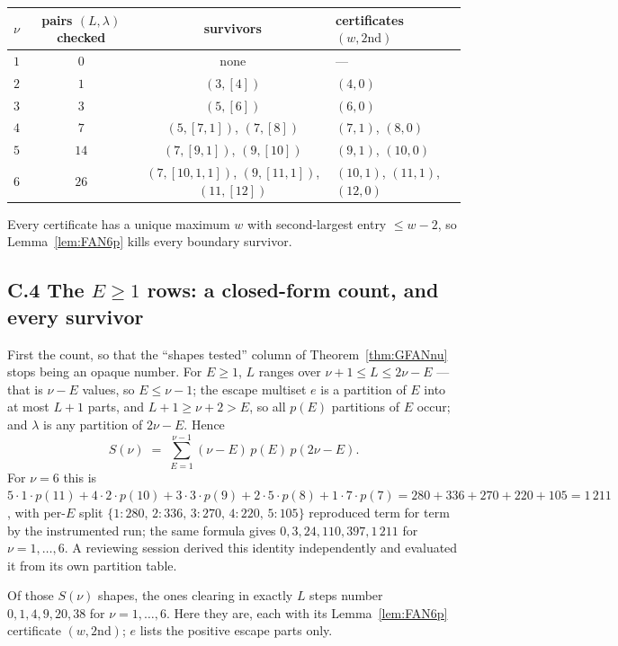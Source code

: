 \begin{center}
\begin{tabular}{@{}cccl@{}}
\toprule
$\nu$ & pairs $(L,\lambda)$ checked & survivors & certificates $(w,\text{2nd})$ \\
\midrule
$1$ & $0$ & none & --- \\
$2$ & $1$ & $(3,[4])$ & $(4,0)$ \\
$3$ & $3$ & $(5,[6])$ & $(6,0)$ \\
$4$ & $7$ & $(5,[7,1])$, $(7,[8])$ & $(7,1)$, $(8,0)$ \\
$5$ & $14$ & $(7,[9,1])$, $(9,[10])$ & $(9,1)$, $(10,0)$ \\
$6$ & $26$ & $(7,[10,1,1])$, $(9,[11,1])$, $(11,[12])$ & $(10,1)$, $(11,1)$, $(12,0)$ \\
\bottomrule
\end{tabular}
\end{center}

Every certificate has a unique maximum $w$ with second-largest entry $\le w-2$, so
Lemma~\ref{lem:FAN6p} kills every boundary survivor.

\subsection*{C.4 The \texorpdfstring{$E \ge 1$}{E >= 1} rows: a closed-form count, and every survivor}

First the count, so that the ``shapes tested'' column of Theorem~\ref{thm:GFANnu} stops
being an opaque number. For $E \ge 1$, $L$ ranges over $\nu+1 \le L \le 2\nu-E$ --- that is
$\nu-E$ values, so $E \le \nu-1$; the escape multiset $e$ is a partition of $E$ into at most
$L+1$ parts, and $L+1 \ge \nu+2 > E$, so all $p(E)$ partitions of $E$ occur; and $\lambda$
is any partition of $2\nu-E$. Hence
\[
S(\nu) \;=\; \sum_{E=1}^{\nu-1} (\nu-E)\, p(E)\, p(2\nu-E).
\]
For $\nu = 6$ this is
$5\cdot1\cdot p(11) + 4\cdot2\cdot p(10) + 3\cdot3\cdot p(9) + 2\cdot5\cdot p(8) +
1\cdot7\cdot p(7) = 280+336+270+220+105 = 1\,211$, with per-$E$ split
$\{1:280,\,2:336,\,3:270,\,4:220,\,5:105\}$ reproduced term for term by the instrumented
run; the same formula gives $0,3,24,110,397,1\,211$ for $\nu = 1,\dots,6$. A reviewing
session derived this identity independently and evaluated it from its own partition table.

Of those $S(\nu)$ shapes, the ones clearing in exactly $L$ steps number
$0,1,4,9,20,38$ for $\nu = 1,\dots,6$. Here they are, each with its Lemma~\ref{lem:FAN6p}
certificate $(w,\text{2nd})$; $e$ lists the positive escape parts only.

